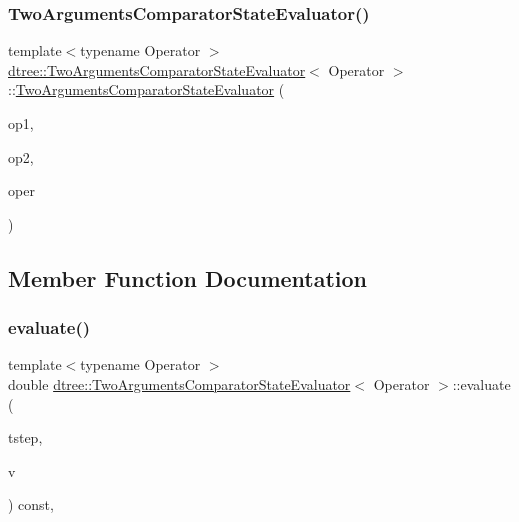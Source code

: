 \subsubsection{\texorpdfstring{TwoArgumentsComparatorStateEvaluator()}{TwoArgumentsComparatorStateEvaluator()}}
{\footnotesize\ttfamily template$<$typename Operator $>$ \\
\mbox{\hyperlink{classdtree_1_1_two_arguments_comparator_state_evaluator}{dtree\+::\+Two\+Arguments\+Comparator\+State\+Evaluator}}$<$ Operator $>$\+::\mbox{\hyperlink{classdtree_1_1_two_arguments_comparator_state_evaluator}{Two\+Arguments\+Comparator\+State\+Evaluator}} (\begin{DoxyParamCaption}\item[{std\+::shared\+\_\+ptr$<$ \mbox{\hyperlink{classdtree_1_1_state_evaluator}{State\+Evaluator}} $>$}]{op1,  }\item[{std\+::shared\+\_\+ptr$<$ \mbox{\hyperlink{classdtree_1_1_state_evaluator}{State\+Evaluator}} $>$}]{op2,  }\item[{Operator}]{oper }\end{DoxyParamCaption})\hspace{0.3cm}{\ttfamily [inline]}}



\subsection{Member Function Documentation}
\mbox{\label{classdtree_1_1_two_arguments_comparator_state_evaluator_a66c62d16f835b0fb914cb7b407fe079d}} 
\subsubsection{\texorpdfstring{evaluate()}{evaluate()}}
{\footnotesize\ttfamily template$<$typename Operator $>$ \\
double \mbox{\hyperlink{classdtree_1_1_two_arguments_comparator_state_evaluator}{dtree\+::\+Two\+Arguments\+Comparator\+State\+Evaluator}}$<$ Operator $>$\+::evaluate (\begin{DoxyParamCaption}\item[{int}]{tstep,  }\item[{\mbox{\hyperlink{class_vessel}{Vessel}} $\ast$}]{v }\end{DoxyParamCaption}) const\hspace{0.3cm}{\ttfamily [inline]}, {\ttfamily [virtual]}}




